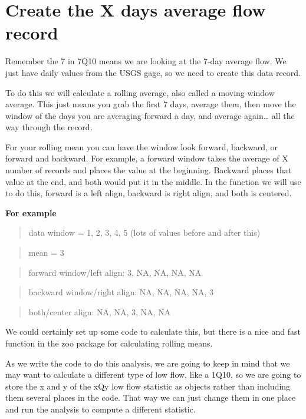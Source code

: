 \documentclass[
]{book}
\begin{document}
\hypertarget{create-the-x-days-average-flow-record}{%
\section{Create the X days average flow record}\label{create-the-x-days-average-flow-record}}

Remember the 7 in 7Q10 means we are looking at the 7-day average flow. We just have daily values from the USGS gage, so we need to create this data record.

To do this we will calculate a rolling average, also called a moving-window average. This just means you grab the first 7 days, average them, then move the window of the days you are averaging forward a day, and average again\ldots{} all the way through the record.

For your rolling mean you can have the window look forward, backward, or forward and backward. For example, a forward window takes the average of X number of records and places the value at the beginning. Backward places that value at the end, and both would put it in the middle. In the function we will use to do this, forward is a left align, backward is right align, and both is centered.

\textbf{For example}

\begin{quote}
data window = 1, 2, 3, 4, 5 (lots of values before and after this)
\end{quote}

\begin{quote}
mean = 3
\end{quote}

\begin{quote}
forward window/left align: 3, NA, NA, NA, NA
\end{quote}

\begin{quote}
backward window/right align: NA, NA, NA, NA, 3
\end{quote}

\begin{quote}
both/center align: NA, NA, 3, NA, NA
\end{quote}

We could certainly set up some code to calculate this, but there is a nice and fast function in the zoo package for calculating rolling means.

As we write the code to do this analysis, we are going to keep in mind that we may want to calculate a different type of low flow, like a 1Q10, so we are going to store the x and y of the xQy low flow statistic as objects rather than including them several places in the code. That way we can just change them in one place and run the analysis to compute a different statistic.
\end{document}
